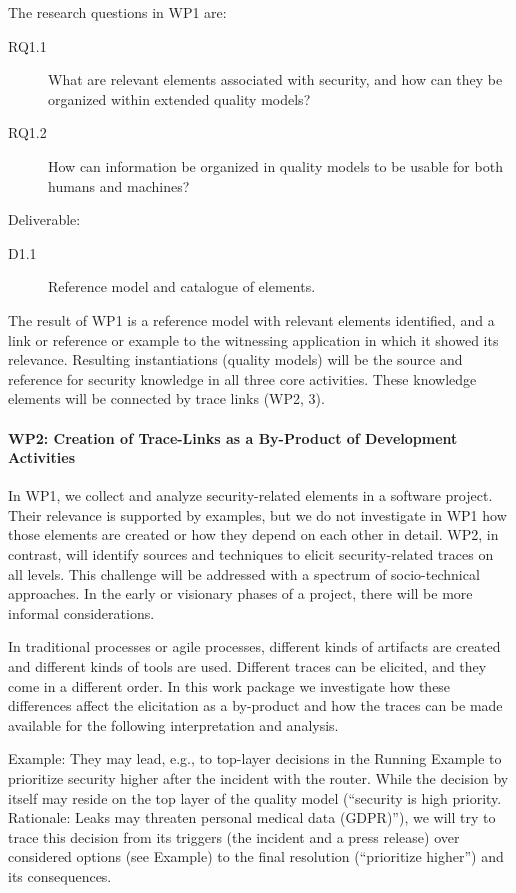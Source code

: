 The research questions in WP1 are:
\begin{description}
	\item[RQ1.1] What are relevant elements associated with security, and how can they be organized within extended quality models?
	\item[RQ1.2] How can information be organized in quality models to be usable for both humans and machines?
\end{description}

Deliverable:  
\begin{description}
\item[D1.1] Reference model and catalogue of elements.
\end{description}

The result of WP1 is a reference model with relevant elements identified, and a link or reference or example to the witnessing application in which it showed its relevance. Resulting instantiations (quality models) will be the source and reference for security knowledge in all three core activities. These knowledge elements will be connected by trace links (WP2, 3).


\paragraph*{WP2: Creation of Trace-Links as a By-Product of Development Activities}
In WP1, we collect and analyze security-related elements in a software project. Their relevance is supported by examples, but we do not investigate in WP1 how those elements are created or how they depend on each other in detail. WP2, in contrast, will identify sources and techniques to elicit security-related traces on all levels. This challenge will be addressed with a spectrum of socio-technical approaches. In the early or visionary phases of a project, there will be more informal considerations.

In traditional processes or agile processes, different kinds of artifacts are created and different kinds of tools are used. Different traces can be elicited, and they come in a different order. In this work package we investigate how these differences affect the elicitation as a by-product and how the traces can be made available for the following interpretation and analysis.

Example: They may lead, e.g., to top-layer decisions in the Running Example to prioritize security higher after the incident with the router. While the decision by itself may reside on the top layer of the quality model (“security is high priority. Rationale: Leaks may threaten personal medical data (GDPR)”), we will try to trace this decision from its triggers (the incident and a press release) over considered options (see Example) to the final resolution (“prioritize higher”) and its consequences.

